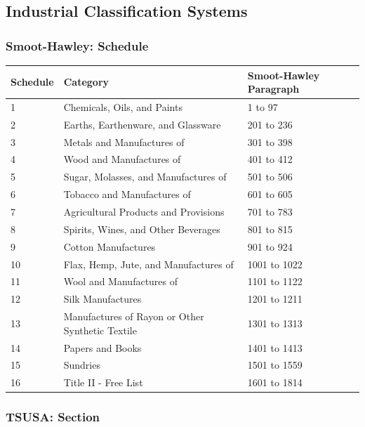 \documentclass[
  12pt,
]{article}
\begin{document}
\hypertarget{industrial-classification-systems}{%
\subsection{Industrial Classification Systems}\label{industrial-classification-systems}}

\hypertarget{smoot-hawley-schedule}{%
\subsubsection{Smoot-Hawley: Schedule}\label{smoot-hawley-schedule}}

\begin{longtable}[]{@{}lll@{}}
\toprule
Schedule & Category & Smoot-Hawley Paragraph \\
\midrule
\endhead
1 & Chemicals, Oils, and Paints & 1 to 97 \\
2 & Earths, Earthenware, and Glassware & 201 to 236 \\
3 & Metals and Manufactures of & 301 to 398 \\
4 & Wood and Manufactures of & 401 to 412 \\
5 & Sugar, Molasses, and Manufactures of & 501 to 506 \\
6 & Tobacco and Manufactures of & 601 to 605 \\
7 & Agricultural Products and Provisions & 701 to 783 \\
8 & Spirits, Wines, and Other Beverages & 801 to 815 \\
9 & Cotton Manufactures & 901 to 924 \\
10 & Flax, Hemp, Jute, and Manufactures of & 1001 to 1022 \\
11 & Wool and Manufactures of & 1101 to 1122 \\
12 & Silk Manufactures & 1201 to 1211 \\
13 & Manufactures of Rayon or Other Synthetic Textile & 1301 to 1313 \\
14 & Papers and Books & 1401 to 1413 \\
15 & Sundries & 1501 to 1559 \\
16 & Title II - Free List & 1601 to 1814 \\
\bottomrule
\end{longtable}

\hypertarget{tsusa-section}{%
\subsubsection{TSUSA: Section}\label{tsusa-section}}
\end{document}
